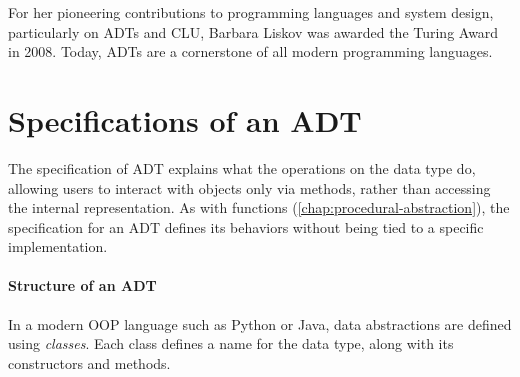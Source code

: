 \documentclass[oneside,11pt,dvipsnames]{book}
\begin{document}
For her pioneering contributions to programming languages and system design, particularly on ADTs and CLU, Barbara Liskov was awarded the Turing Award in 2008. Today, ADTs are a cornerstone of all modern programming languages.







\section{Specifications of an ADT}

The specification of ADT explains what the operations on the data type do, allowing users to interact with objects only via methods, rather than accessing the internal representation. 
As with functions (\autoref{chap:procedural-abstraction}), the specification for an ADT defines its behaviors without being tied to a specific implementation.


\paragraph{Structure of an ADT} In a modern OOP language such as Python or Java, data abstractions are defined using \emph{classes}. Each class defines a name for the data type, along with its constructors and methods.
\end{document}
